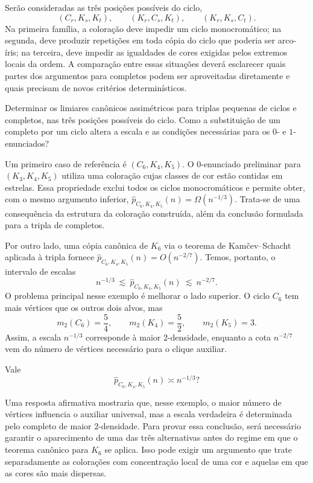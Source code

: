 \documentclass[11pt,a4paper]{article}
\theoremstyle{plain}
\theoremstyle{definition}
\newcounter{question}[section]
\renewcommand{\thequestion}{\thesection.\arabic{question}}
\newenvironment{question}[1][]{%
  \refstepcounter{question}%
  \begin{tcolorbox}[
    enhanced,
    colback=qbluebg,
    colframe=qblue,
    arc=4pt,
    boxrule=1.2pt,
    left=8pt, right=8pt, top=6pt, bottom=6pt,
    fonttitle=\bfseries\sffamily,
    title={\color{white}Pergunta~\thequestion\ifx&#1&\else\ (#1)\fi},
    coltitle=white,
    attach boxed title to top left={yshift=-2mm, xshift=6pt},
    boxed title style={colback=qblue, arc=3pt, boxrule=0pt},
  ]%
  \itshape
}{%
  \end{tcolorbox}%
}
\begin{document}
Serão consideradas as três posições possíveis do ciclo,
\[
  (C_r,K_s,K_t),\qquad
  (K_r,C_s,K_t),\qquad
  (K_r,K_s,C_t).
\]
Na primeira família, a coloração deve impedir um ciclo monocromático;
na segunda, deve produzir repetições em toda cópia do ciclo que
poderia ser arco-íris; na terceira, deve impedir as igualdades de
cores exigidas pelos extremos locais da ordem. A comparação entre
essas situações deverá esclarecer quais partes dos argumentos para
completos podem ser aproveitadas diretamente e quais precisam de
novos critérios determinísticos.

\begin{question}[limiares para triplas mistas]
  \label{q:mistas}
  Determinar os limiares canônicos assimétricos para triplas
  pequenas de ciclos e completos, nas três posições possíveis
  do ciclo. Como a substituição de um completo por um ciclo
  altera a escala e as condições necessárias para os
  $0$- e $1$-enunciados?
\end{question}

Um primeiro caso de referência é
$(C_6,K_4,K_5).$
O $0$-enunciado preliminar para $(K_3,K_4,K_5)$ utiliza uma
coloração cujas classes de cor estão contidas em estrelas. Essa
propriedade exclui todos os ciclos monocromáticos e permite obter,
com o mesmo argumento inferior,
$\widehat p_{C_6,K_4,K_5}(n)=\Omega(n^{-1/3}).$
Trata-se de uma consequência da estrutura da coloração construída,
além da conclusão formulada para a tripla de completos.

Por outro lado, uma cópia canônica de $K_6$ via o teorema de Kamčev--Schacht aplicada à tripla
fornece
$\widehat p_{C_6,K_4,K_5}(n)=O(n^{-2/7}).$
Temos, portanto, o intervalo de escalas
\begin{equation}
  \label{eq:intervalo-C6}
  n^{-1/3}\ \lesssim\
  \widehat p_{C_6,K_4,K_5}(n)
  \ \lesssim\ n^{-2/7}.
\end{equation}
O problema principal nesse exemplo é melhorar o lado superior.
O ciclo $C_6$ tem mais vértices que os outros dois alvos, mas
\[
  m_2(C_6)=\frac54,\qquad
  m_2(K_4)=\frac52,\qquad
  m_2(K_5)=3.
\]
Assim, a escala $n^{-1/3}$ corresponde à maior $2$-densidade,
enquanto a cota $n^{-2/7}$ vem do número de vértices necessário
para o clique auxiliar.

\begin{question}[o caso $(C_6,K_4,K_5)$]
  \label{q:C6}
  Vale
  \[
    \widehat p_{C_6,K_4,K_5}(n)\asymp n^{-1/3}?
  \]
\end{question}

Uma resposta afirmativa mostraria que, nesse exemplo, o maior
número de vértices influencia o auxiliar universal, mas a escala
verdadeira é determinada pelo completo de maior $2$-densidade.
Para provar essa conclusão, será necessário garantir o aparecimento
de uma das três alternativas antes do regime em que o teorema
canônico para $K_6$ se aplica. Isso pode exigir um argumento que
trate separadamente as colorações com concentração local de uma
cor e aquelas em que as cores são mais dispersas.
\end{document}
